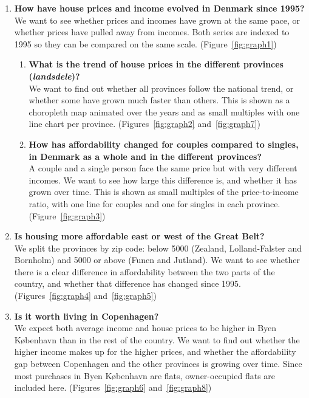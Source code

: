 \begin{enumerate}
  \item \textbf{How have house prices and income evolved in Denmark since 1995?}\\
  We want to see whether prices and incomes have grown at the same pace, or whether prices have pulled away from incomes. Both series are indexed to 1995 so they can be compared on the same scale. (Figure~\ref{fig:graph1})

  \begin{enumerate}
    \item \textbf{What is the trend of house prices in the different provinces (\textit{landsdele})?}\\
    We want to find out whether all provinces follow the national trend, or whether some have grown much faster than others. This is shown as a choropleth map animated over the years and as small multiples with one line chart per province. (Figures~\ref{fig:graph2} and~\ref{fig:graph7})

    \item \textbf{How has affordability changed for couples compared to singles, in Denmark as a whole and in the different provinces?}\\
    A couple and a single person face the same price but with very different incomes. We want to see how large this difference is, and whether it has grown over time. This is shown as small multiples of the price-to-income ratio, with one line for couples and one for singles in each province. (Figure~\ref{fig:graph3})
  \end{enumerate}

  \item \textbf{Is housing more affordable east or west of the Great Belt?}\\
  We split the provinces by zip code: below 5000 (Zealand, Lolland-Falster and Bornholm) and 5000 or above (Funen and Jutland). We want to see whether there is a clear difference in affordability between the two parts of the country, and whether that difference has changed since 1995. (Figures~\ref{fig:graph4} and~\ref{fig:graph5})

  \item \textbf{Is it worth living in Copenhagen?}\\
  We expect both average income and house prices to be higher in Byen K\o benhavn than in the rest of the country. We want to find out whether the higher income makes up for the higher prices, and whether the affordability gap between Copenhagen and the other provinces is growing over time. Since most purchases in Byen K\o benhavn are flats, owner-occupied flats are included here. (Figures~\ref{fig:graph6} and~\ref{fig:graph8})
\end{enumerate}
